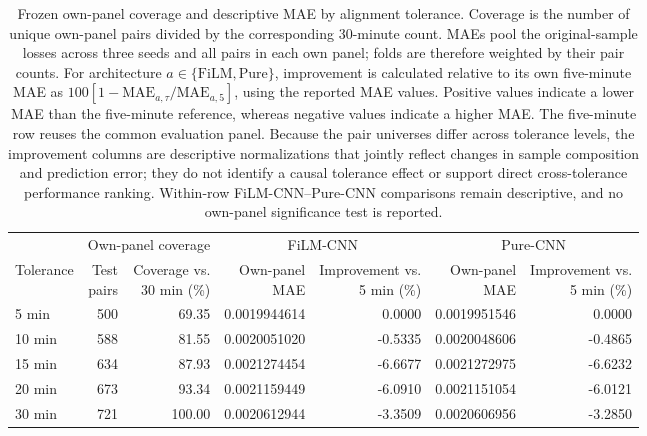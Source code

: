 \begin{table}[htbp]
\centering
\scriptsize
\setlength{\tabcolsep}{2.5pt}

\begin{tabular}{@{}lrr@{\hspace{6pt}}rr@{\hspace{6pt}}rr@{}}
\toprule
& \multicolumn{2}{c}{Own-panel coverage}
& \multicolumn{2}{c}{FiLM-CNN}
& \multicolumn{2}{c}{Pure-CNN} \\
\cmidrule(lr){2-3}
\cmidrule(lr){4-5}
\cmidrule(l){6-7}
Tolerance
& \shortstack{Test\\pairs}
& \shortstack{Coverage vs.\\30 min (\%)}
& \shortstack{Own-panel\\MAE}
& \shortstack{Improvement vs.\\5 min (\%)}
& \shortstack{Own-panel\\MAE}
& \shortstack{Improvement vs.\\5 min (\%)} \\
\midrule
5 min
& 500
& 69.35
& 0.0019944614
& 0.0000
& 0.0019951546
& 0.0000 \\

10 min
& 588
& 81.55
& 0.0020051020
& -0.5335
& 0.0020048606
& -0.4865 \\

15 min
& 634
& 87.93
& 0.0021274454
& -6.6677
& 0.0021272975
& -6.6232 \\

20 min
& 673
& 93.34
& 0.0021159449
& -6.0910
& 0.0021151054
& -6.0121 \\

30 min
& 721
& 100.00
& 0.0020612944
& -3.3509
& 0.0020606956
& -3.2850 \\
\bottomrule
\end{tabular}

\caption{Frozen own-panel coverage and descriptive MAE by alignment
tolerance. Coverage is the number of unique own-panel pairs divided by the
corresponding 30-minute count. MAEs pool the original-sample losses across
three seeds and all pairs in each own panel; folds are therefore weighted by
their pair counts. For architecture
\(a\in\{\mathrm{FiLM},\mathrm{Pure}\}\), improvement is calculated relative
to its own five-minute MAE as
\(100[1-\mathrm{MAE}_{a,\tau}/\mathrm{MAE}_{a,5}]\), using the reported MAE
values. Positive values indicate a lower MAE than the five-minute reference,
whereas negative values indicate a higher MAE. The five-minute row reuses the
common evaluation panel. Because the pair universes differ across tolerance
levels, the improvement columns are descriptive normalizations that jointly
reflect changes in sample composition and prediction error; they do not
identify a causal tolerance effect or support direct cross-tolerance
performance ranking. Within-row FiLM-CNN--Pure-CNN comparisons remain
descriptive, and no own-panel significance test is reported.}
\label{tab:ch3:alignment_window_coverage}
\end{table}

